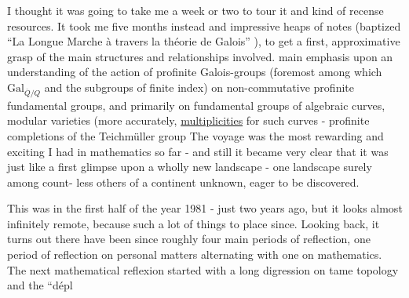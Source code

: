  I thought it was going to take me a week or two to tour it and 
kind of recense resources. It took me five months instead  and  impressive
heaps of notes (baptized  ``La Longue Marche à travers la théorie de
Galois'' ),  to get a  first,  approximative grasp of  the
main structures and relationships involved.  main emphasis  upon \margin{/}
an understanding of the action of profinite Galois-groups (foremost
among which $\mathrm{Gal}_{\overline{Q}/Q}$ and the subgroups of finite index) on non-commutative
profinite fundamental groups,  and primarily on fundamental groups of
algebraic curves, modular varieties (more accurately,  \uline{multiplicities}\hand{)}
for such curves -   profinite completions of the Teichmüller group
The voyage was the most rewarding and exciting I had in mathematics so
far  -  and still it became very clear that it was just like a first
glimpse upon a wholly new landscape - one landscape surely among count-%
less others of a continent unknown,  eager to be discovered.

This was in the first half of the year 1981  -  just two years ago,
 but it looks almost infinitely remote,  because such a lot of things to
place since.  Looking back,  it turns out there have been since roughly
four main  periods of reflection,  one period of reflection on personal
matters alternating with one on mathematics.  The next mathematical
reflexion started with a long digression on tame topology and the ``dépl

